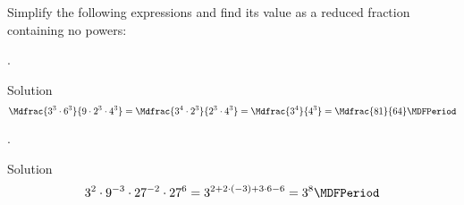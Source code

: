 \begin{MExercises}
\begin{MExercise}
Simplify the following expressions and find its value as a reduced fraction containing no powers:
\begin{MExerciseItems}
\item{.\\\begin{MHint}{Solution} $$\Mdfrac{3^3\cdot 6^3}{9\cdot2^3\cdot 4^3}=\Mdfrac{3^4\cdot 2^3}{2^3\cdot 4^3}=\Mdfrac{3^4}{4^3}=\Mdfrac{81}{64} \MDFPeriod$$\end{MHint}}
\item{.\\\begin{MHint}{Solution} $$3^2\cdot 9^{-3}\cdot 27^{-2}\cdot 27^{6}=3^{2+2\cdot(-3)+3\cdot 6-6}=3^{8} \MDFPeriod$$\end{MHint}}
\end{MExerciseItems}
\end{MExercise}

% 


\end{MExercises}


